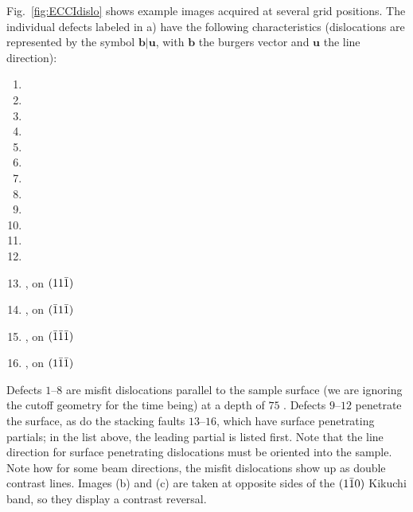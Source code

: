 \documentclass[DIV=calc, paper=letter, fontsize=11pt]{scrartcl}	 %
\begin{document}
Fig.~\ref{fig:ECCIdislo} shows example images acquired at several grid positions.  The individual defects labeled in a) have the following
characteristics (dislocations are represented by the symbol $\mathbf{b}\vert\mathbf{u}$, with $\mathbf{b}$ the burgers vector and $\mathbf{u}$
the line direction):
{\small \begin{enumerate}
	\item {}
	\item {}
	\item {}
	\item {}
	\item {}
	\item {}
	\item {}
	\item {}

	\item {}
	\item {}
	\item {}
	\item {}
	
	\item {},  on $(11\bar{1})$
	\item {},  on $(\bar{1} 1\bar{1})$
	\item {},  on $(\bar{1}\bar{1}\bar{1})$
	\item {},  on $(1\bar{1}\bar{1})$
	\end{enumerate}}
Defects $1$--$8$ are misfit dislocations parallel to the sample surface (we are ignoring the cutoff geometry for the time being) at a 
depth of $75$ \nano\meter. Defects $9$--$12$ penetrate the surface, as do the stacking faults $13$--$16$, which have surface penetrating 
partials; in the list above, the leading partial is listed first.  Note that the line direction for surface penetrating dislocations 
must be oriented into the sample.  Note how for some beam directions, the misfit dislocations show up as double contrast lines.  Images (b) and (c) 
are taken at opposite sides of the $(1\bar{1} 0)$ Kikuchi band, so they display a contrast reversal.
\end{document}
